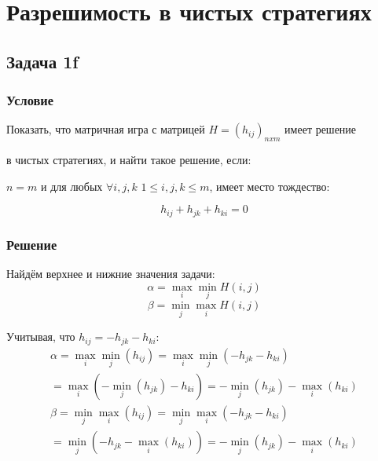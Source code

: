\documentclass[a4paper,14pt]{extreport}
\begin{document}
\maketitle
\setcounter{page}{2}

\chapter{Разрешимость в чистых стратегиях}
\section{Задача 1f}
\subsection{Условие}

Показать, что матричная игра с матрицей $H=(h_{ij})_{nxm}$ имеет решение \par
в чистых стратегиях, и найти такое решение, если: \par 
$n=m$ и для любых $\forall i, j, k$  $1 \leqslant i, j, k \leqslant m$, имеет место тождество: \par
\begin{equation*}
    h_{ij}+h_{jk} + h_{ki} = 0
\end{equation*}

\subsection{Решение}
Найдём верхнее и нижние значения задачи:
\begin{equation}
    \alpha = \max_i\min_jH(i,j)
\end{equation}
\begin{equation}
    \beta = \min_j\max_iH(i,j)
\end{equation}

Учитывая, что $h_{ij}=-h_{jk}-h_{ki}$:
\begin{equation}
\begin{split}
    \alpha = \max_i\min_j(h_{ij}) = \max_i\min_j(-h_{jk} - h_{ki}) \\ = \max_i(-\min_j(h_{jk}) - h_{ki}) = -\min_j(h_{jk}) - \max_i(h_{ki})
\end{split}
\end{equation}
\begin{equation}
\begin{split}
    \beta = \min_j\max_i(h_{ij}) = \min_j\max_i(-h_{jk} - h_{ki}) \\ = \min_j(-h_{jk} -\max_i(h_{ki})) = -\min_j(h_{jk}) - \max_i(h_{ki})
\end{split}
\end{equation}
\end{document}
